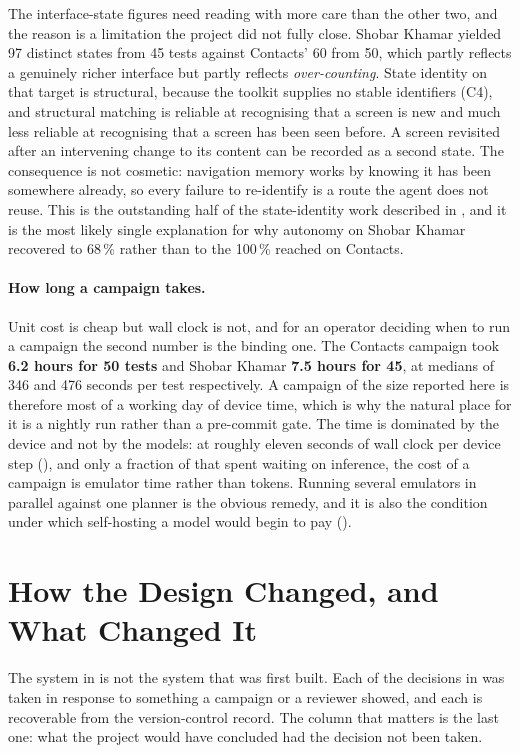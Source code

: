 The interface-state figures need reading with more care than the other two, and
the reason is a limitation the project did not fully close. Shobar Khamar
yielded 97 distinct states from 45 tests against Contacts' 60 from 50, which
partly reflects a genuinely richer interface but partly reflects
\emph{over-counting}. State identity on that target is structural, because the
toolkit supplies no stable identifiers (C4), and structural matching is
reliable at recognising that a screen is new and much less reliable at
recognising that a screen has been seen before. A screen revisited after an
intervening change to its content can be recorded as a second state. The
consequence is not cosmetic: navigation memory works by knowing it has been
somewhere already, so every failure to re-identify is a route the agent does
not reuse. This is the outstanding half of the state-identity work described in
, and it is the most likely single explanation for why
autonomy on Shobar Khamar recovered to 68\,\% rather than to the 100\,\%
reached on Contacts.

\paragraph{How long a campaign takes.} Unit cost is cheap but wall clock is
not, and for an operator deciding when to run a campaign the second number is
the binding one. The Contacts campaign took \textbf{6.2 hours for 50 tests} and
Shobar Khamar \textbf{7.5 hours for 45}, at medians of 346 and 476 seconds per
test respectively. A campaign of the size reported here is therefore most of a
working day of device time, which is why the natural place for it is a nightly
run rather than a pre-commit gate. The time is dominated by the device and not
by the models: at roughly eleven seconds of wall clock per device step
(), and only a fraction of that spent waiting on inference,
the cost of a campaign is emulator time rather than tokens. Running several
emulators in parallel against one planner is the obvious remedy, and it is also
the condition under which self-hosting a model would begin to pay
().

\section{How the Design Changed, and What Changed It}
\label{sec:design-evolution}

The system in  is not the system that was first built. Each of
the decisions in  was taken in response to something a
campaign or a reviewer showed, and each is recoverable from the version-control
record. The column that matters is the last one: what the project would have
concluded had the decision not been taken.

